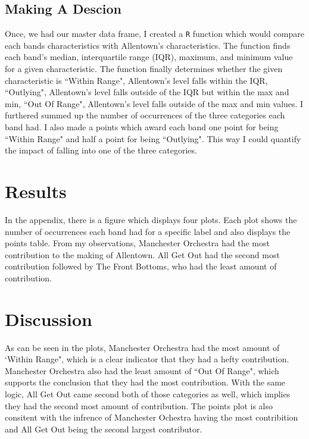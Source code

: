 \documentclass{article}\usepackage[]{graphicx}\usepackage[]{xcolor}
\begin{document}
\begin{multicols}{2}
\subsection{Making A Descion}
Once, we had our master data frame, I created a \texttt{R} function which would compare each bands characteristics with Allentown's characteristics. The function finds each band's median, interquartile range (IQR), maximum, and minimum value for a given characteristic. The function finally determines whether the given characteristic is ``Within Range", Allentown's level falls within the IQR, ``Outlying", Allentown's level falls outside of the IQR but within the max and min, ``Out Of Range", Allentown's level falls outside of the max and min values. I furthered summed up the number of occurrences of the three categories each band had. I also made a points which award each band one point for being ``Within Range" and half a point for being ``Outlying". This way I could quantify the impact of falling into one of the three categories.

\section{Results}
In the appendix, there is a figure which displays four plots. Each plot shows the number of occurrences each band had for a specific label and also displays the points table. From my observations, Manchester Orchestra had the most contribution to the making of Allentown. All Get Out had the second most contribution followed by The Front Bottoms, who had the least amount of contribution.

\section{Discussion}
As can be seen in the plots, Manchester Orchestra had the most amount of `Within Range", which is a clear indicator that they had a hefty contribution. Manchester Orchestra also had the least amount of ``Out Of Range", which supports the conclusion that they had the most contribution. With the same logic, All Get Out came second both of those categories as well, which implies they had the second most amount of contribution. The points plot is also consitent with the infrence of Manchester Ochestra having the most contribition and All Get Out being the second largest contributor.

\vspace{2em}

\begin{tiny}

\end{tiny}
\end{multicols}
\end{document}
